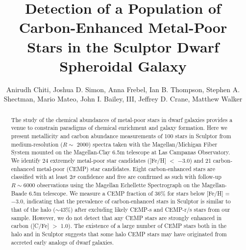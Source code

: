 \documentclass{emulateapj-rtx4}
\begin{document}
\title{Detection of a Population of Carbon-Enhanced Metal-Poor Stars
  in the Sculptor Dwarf Spheroidal Galaxy\altaffilmark{*}}


\author{Anirudh Chiti, Joshua
  D. Simon, Anna Frebel, Ian
  B. Thompson, Stephen A. Shectman,
  Mario Mateo, John I. Bailey, III, 
  Jeffrey D. Crane,
  Matthew Walker}


\begin{abstract}
The study of the chemical abundances of metal-poor stars in dwarf galaxies provides a venue to constrain paradigms of chemical enrichment and galaxy formation. Here we present metallicity and carbon abundance measurements of 100 stars in Sculptor from medium-resolution ($R \sim$ 2000) spectra taken with the Magellan/Michigan Fiber System mounted on the Magellan-Clay 6.5m telescope at Las Campanas Observatory. We identify 24 extremely metal-poor star candidates ([Fe/H] $<$ $-$3.0) and 21 carbon-enhanced metal-poor (CEMP) star candidates. Eight carbon-enhanced stars are classified with at least 2$\sigma$ confidence and five are confirmed as such with follow-up $R\sim6000$ observations using the Magellan Echellette Spectrograph on the Magellan-Baade 6.5m telescope. We measure a CEMP fraction of 36\% for stars below [Fe/H] = $-$3.0, indicating that the prevalence of carbon-enhanced stars in Sculptor is similar to that of the halo ($\sim43\%$) after excluding likely CEMP-s and CEMP-r/s stars from our sample. However, we do not detect that any CEMP stars are strongly enhanced in carbon ([C/Fe] $>$ 1.0). The existence of a large number of CEMP stars both in the halo and in Sculptor suggests that some halo CEMP stars may have originated from accreted early analogs of dwarf galaxies.

\end{abstract}
\end{document}
